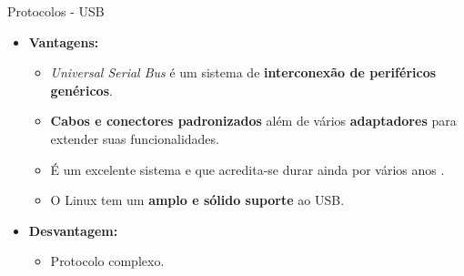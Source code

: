 	\begin{frame}{Protocolos - USB}
		\begin{itemize}
			\setlength\itemsep{1em}
			\item \textbf{Vantagens:}
			\begin{itemize}
				\setlength\itemsep{0.7em}
				\item \textit{Universal Serial Bus} é um sistema de \textbf{interconexão de periféricos genéricos}.
				\item \textbf{Cabos e conectores padronizados} além de vários \textbf{adaptadores} para extender suas funcionalidades.
				\item É um excelente sistema e que acredita-se durar ainda por vários anos \cite{nemeth2004manual}.
				\item O Linux tem um \textbf{amplo e sólido suporte} ao USB.
			\end{itemize}
			\item \textbf{Desvantagem:}
			\begin{itemize}
				\item Protocolo complexo.
			\end{itemize}
		\end{itemize}
	\end{frame}
